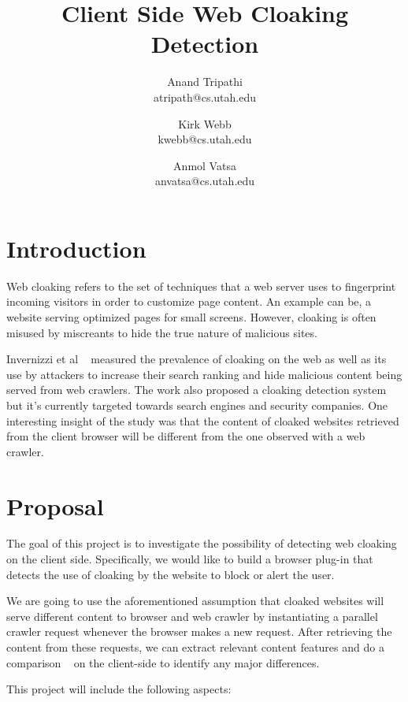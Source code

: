 \documentclass{article}
\title{Client Side Web Cloaking Detection}
\author{
Anand Tripathi\\
       atripath@cs.utah.edu
\and 
Kirk Webb\\
       kwebb@cs.utah.edu
\and
Anmol Vatsa\\
       anvatsa@cs.utah.edu
}
\begin{document}
\maketitle

\section{Introduction}
Web cloaking refers to the set of techniques that a web server uses to fingerprint incoming visitors in order to customize page content. An example can be, a website serving optimized pages for small screens. However, cloaking is often misused by miscreants to hide the true nature of malicious sites.

Invernizzi et al ~\cite{cloak} measured the prevalence of cloaking on the web as well as its use by attackers to increase their search ranking and hide malicious content being served from web crawlers. The work also proposed a cloaking detection system but it's currently targeted towards search engines and security companies. One interesting insight of the study was that the content of cloaked websites retrieved from the client browser will be different from the one observed with a web crawler.

\section{Proposal}
The goal of this project is to investigate the possibility of detecting web cloaking on the client side.  Specifically, we would like to build a browser plug-in that detects the use of cloaking by the website to block or alert the user.

We are going to use the aforementioned assumption that cloaked websites will serve different content to browser and web crawler by instantiating a parallel crawler request whenever the browser makes a new request. After retrieving the content from these requests, we can extract relevant content features and do a comparison ~\cite{cloak} on the client-side to identify any major differences.

This project will include the following aspects:
\end{document}
